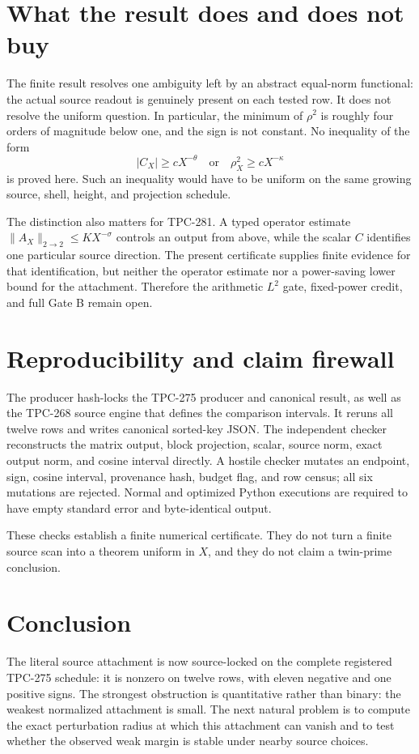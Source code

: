 \documentclass[11pt]{article}
\begin{document}
\section{What the result does and does not buy}

The finite result resolves one ambiguity left by an abstract equal-norm
functional: the actual source readout is genuinely present on each tested row.
It does not resolve the uniform question.  In particular, the minimum of
$\rho^2$ is roughly four orders of magnitude below one, and the sign is not
constant.  No inequality of the form
\[
 |C_X|\geq cX^{-\theta}
 \quad\text{or}\quad \rho_X^2\geq cX^{-\kappa}
 \label{eq:open}
\]
is proved here.  Such an inequality would have to be uniform on the same
growing source, shell, height, and projection schedule.

The distinction also matters for TPC-281.  A typed operator estimate
$\|A_X\|_{2\to2}\leq KX^{-\sigma}$ controls an output from above, while
the scalar $C$ identifies one particular source direction.  The present
certificate supplies finite evidence for that identification, but neither the
operator estimate nor a power-saving lower bound for the attachment.  Therefore
the arithmetic $L^2$ gate, fixed-power credit, and full Gate B remain open.

\section{Reproducibility and claim firewall}

The producer hash-locks the TPC-275 producer and canonical result, as well as
the TPC-268 source engine that defines the comparison intervals.  It reruns all
twelve rows and writes canonical sorted-key JSON.  The independent checker
reconstructs the matrix output, block projection, scalar, source norm, exact
output norm, and cosine interval directly.  A hostile checker mutates an
endpoint, sign, cosine interval, provenance hash, budget flag, and row census;
all six mutations are rejected.  Normal and optimized Python executions are
required to have empty standard error and byte-identical output.

These checks establish a finite numerical certificate.  They do not turn a
finite source scan into a theorem uniform in $X$, and they do not claim a
twin-prime conclusion.

\section{Conclusion}

The literal source attachment is now source-locked on the complete registered
TPC-275 schedule: it is nonzero on twelve rows, with eleven negative and one
positive signs.  The strongest obstruction is quantitative rather than binary:
the weakest normalized attachment is small.  The next natural problem is to
compute the exact perturbation radius at which this attachment can vanish and
to test whether the observed weak margin is stable under nearby source choices.



\end{document}

